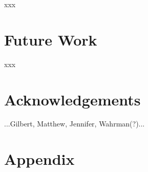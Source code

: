 \documentclass[letterpaper]{article}
\begin{document}
xxx
\par

\section{Future Work}
\label{sec:future}

xxx
\par

\section{Acknowledgements}
\label{sec:ack}

...Gilbert, Matthew, Jennifer, Wahrman(?)...
\par







\appendix
\onecolumn
\section{Appendix}
\label{sec:appendix}
\end{document}
